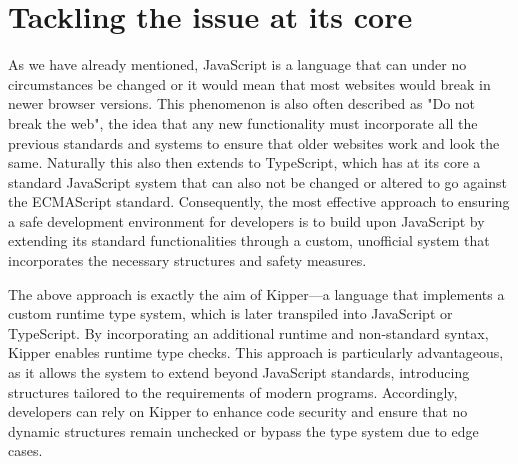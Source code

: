 \section{Tackling the issue at its core}

As we have already mentioned, JavaScript is a language that can under no circumstances be changed or it would mean that most websites would break in newer browser versions. This phenomenon is also often described as "Do not break the web", the idea that any new functionality must incorporate all the previous standards and systems to ensure that older websites work and look the same. Naturally this also then extends to TypeScript, which has at its core a standard JavaScript system that can also not be changed or altered to go against the ECMAScript standard. Consequently, the most effective approach to ensuring a safe development environment for developers is to build upon JavaScript by extending its standard functionalities through a custom, unofficial system that incorporates the necessary structures and safety measures.

The above approach is exactly the aim of Kipper—a language that implements a custom runtime type system, which is later transpiled into JavaScript or TypeScript. By incorporating an additional runtime and non-standard syntax, Kipper enables runtime type checks. This approach is particularly advantageous, as it allows the system to extend beyond JavaScript standards, introducing structures tailored to the requirements of modern programs. Accordingly, developers can rely on Kipper to enhance code security and ensure that no dynamic structures remain unchecked or bypass the type system due to edge cases.

